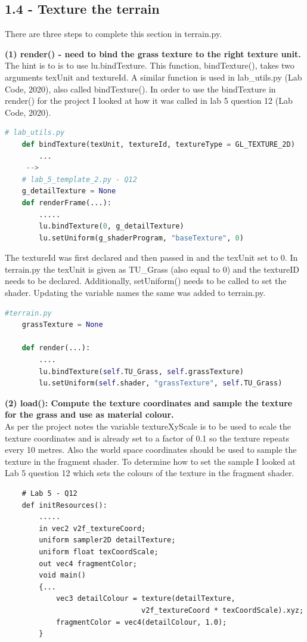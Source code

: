 \documentclass[a4 paper, 12pt]{article}
\begin{document}
\subsection{1.4 - Texture the terrain}
There are three steps to complete this section in terrain.py. 

\textbf{(1) render() - need to bind the grass texture to the right texture unit.} \\ 
The hint is to is to use lu.bindTexture. This function, bindTexture(), takes two arguments texUnit and textureId. A similar function is used in lab\_utils.py (Lab Code, 2020), also called bindTexture(). In order to use the bindTexture in render() for the project I looked at how it was called in lab 5 question 12 (Lab Code, 2020).
    
    \begin{lstlisting}[language=python]
    # lab_utils.py
    def bindTexture(texUnit, textureId, textureType = GL_TEXTURE_2D)
        ...
     -->
    # lab_5_template_2.py - Q12
    g_detailTexture = None
    def renderFrame(...):
        .....
        lu.bindTexture(0, g_detailTexture)
        lu.setUniform(g_shaderProgram, "baseTexture", 0)
    \end{lstlisting}

The textureId was first declared and then passed in and the texUnit set to 0. In terrain.py the texUnit is given as TU\_Grass (also equal to 0) and the textureID needs to be declared. Additionally, setUniform() needs to be called to set the shader. Updating the variable names the same was added to terrain.py.
    \begin{lstlisting}[language=python]       
    #terrain.py
    grassTexture = None

    def render(...):
        ....
        lu.bindTexture(self.TU_Grass, self.grassTexture)
        lu.setUniform(self.shader, "grassTexture", self.TU_Grass)        
    \end{lstlisting}


    
\textbf{(2) load(): Compute the texture coordinates and sample the texture for the grass and use as material colour.} \\
As per the project notes the variable textureXyScale is to be used to scale the texture coordinates and is already set to a factor of 0.1 so the texture repeats every 10 metres. Also the world space coordinates should be used  to sample the texture in the fragment shader. To determine how to set the sample I looked at Lab 5 question 12 which sets the colours of the texture in the fragment shader.
\begin{lstlisting}
    # Lab 5 - Q12   
    def initResources():
        .....         
        in vec2 v2f_textureCoord;
        uniform sampler2D detailTexture; 
        uniform float texCoordScale; 
        out vec4 fragmentColor;
        void main() 
        {...
            vec3 detailColour = texture(detailTexture, 
                                v2f_textureCoord * texCoordScale).xyz;      
            fragmentColor = vec4(detailColour, 1.0);
        }        
\end{lstlisting}
\end{document}
